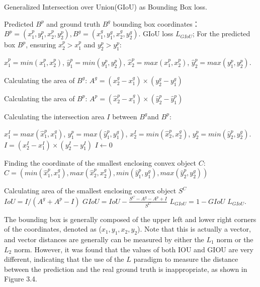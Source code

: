 \begin{algorithm}[htb]
  \caption{ Generalized Intersection over Union(GIoU) as Bounding Box loss.}
  \label{alg:Framwork}
  \begin{algorithmic}[1]
    \Require
    Predicted $B^{p}$ and ground truth $B^{g}$ bounding box coordinates：
     $ B^{p}=\left ( x_{1}^{p},y_{1}^{p},x_{2}^{p},y_{2}^{p} \right ),B^{g}=\left ( x_{1}^{g},y_{1}^{g},x_{2}^{g},y_{2}^{g} \right ).$
    \Ensure
     GIoU loss $L_{GIoU}$;
    \State For the predicted box $B^{p}$, ensuring $x_{2}^{p} > x_{1}^{p}$ and $y_{2}^{p} > y_{1}^{p}$:
    
    $\hat{x}_{1}^{p}=min( x_{1}^{p},x_{2}^{p})$, $\hat{y}_{1}^{p}=min( y_{1}^{p},y_{2}^{p})$,
    $\hat{x}_{2}^{p}=max( x_{1}^{p},x_{2}^{p})$, $\hat{y}_{2}^{p}=max( y_{1}^{p},y_{2}^{p})$.

    
    \State Calculating the area of $B^{g}$:
    $A^{g}=(x_{2}^{g}-x_{1}^{g}) \times (y_{2}^{g}-y_{1}^{g})$
   
    \State  Calculating the area of $B^{p}$:
    $A^{p}=(\hat{x}_{2}^{p}-\hat{x}_{1}^{g}) \times (\hat{y}_{2}^{p}-\hat{y}_{1}^{p})$
    
    \State Calculating the intersection area $I$ between  $B^{g}$and  $B^{p}$:
    
    $x_{1}^{I}=max( \hat{x}_{1}^{p},x_{1}^{g})$, $y_{1}^{p}=max( \hat{y}_{1}^{p},y_{1}^{g})$,
    $x_{2}^{I}=min(\hat{x}_{2}^{p},x_{2}^{g})$, $y_{2}^{p}=min(\hat{y}_{2}^{p},y_{2}^{g})$.
      \State  $I= (x_{2}^{I}-x_{1}^{I}) \times (y_{2}^{I}-y_{1}^{I})$ 
    \Else
      \State $I \gets 0$
      
    \EndIf
    \State Finding the coordinate of the smallest enclosing convex object $C$:
      $ C=\left ( min( \hat{x}_{1}^{p},x_{1}^{g}), max(\hat{x}_{2}^{p},x_{2}^{g}),
      min( \hat{y}_{1}^{p},y_{1}^{g}), max(\hat{y}_{2}^{p},y_{2}^{g}) \right )$
    
    \State Calculating area of the smallest enclosing convex object $S^{C}$
    \State $IoU=I/( A^{g} + A^{p} - I)$
    \State $GIoU=  IoU -\frac{S^{C}-A^{g} - A^{p} + I}{S^{C}}$
    \State $L_{GIoU}=1-GIoU$
    \newline
    \Return $L_{GIoU}$.
  \end{algorithmic}
\end{algorithm}

The bounding box is generally composed of the upper left and lower right corners of the coordinates, denoted as ($x_{1}, y_{1}, x_{2}, y_{2}$). Note that this is actually a vector, and vector distances are generally can be measured by either the $ L_{1}$ norm or the $ L_{2}$ norm. However, it was found that the values of both IOU and GIOU are very different, indicating that the use of the $L$ paradigm to measure the distance between the prediction and the real ground truth is inappropriate, as shown in  Figure 3.4.



